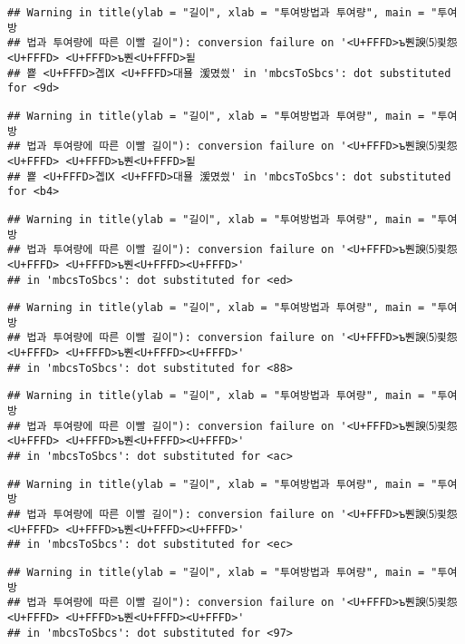 \documentclass[]{article}
\begin{document}
\begin{verbatim}
## Warning in title(ylab = "길이", xlab = "투여방법과 투여량", main = "투여방
## 법과 투여량에 따른 이빨 길이"): conversion failure on '<U+FFFD>ъ뿬諛⑸쾿怨<U+FFFD> <U+FFFD>ъ뿬<U+FFFD>됱
## 뿉 <U+FFFD>곕Ⅸ <U+FFFD>대묠 湲몄씠' in 'mbcsToSbcs': dot substituted for <9d>
\end{verbatim}

\begin{verbatim}
## Warning in title(ylab = "길이", xlab = "투여방법과 투여량", main = "투여방
## 법과 투여량에 따른 이빨 길이"): conversion failure on '<U+FFFD>ъ뿬諛⑸쾿怨<U+FFFD> <U+FFFD>ъ뿬<U+FFFD>됱
## 뿉 <U+FFFD>곕Ⅸ <U+FFFD>대묠 湲몄씠' in 'mbcsToSbcs': dot substituted for <b4>
\end{verbatim}

\begin{verbatim}
## Warning in title(ylab = "길이", xlab = "투여방법과 투여량", main = "투여방
## 법과 투여량에 따른 이빨 길이"): conversion failure on '<U+FFFD>ъ뿬諛⑸쾿怨<U+FFFD> <U+FFFD>ъ뿬<U+FFFD><U+FFFD>'
## in 'mbcsToSbcs': dot substituted for <ed>
\end{verbatim}

\begin{verbatim}
## Warning in title(ylab = "길이", xlab = "투여방법과 투여량", main = "투여방
## 법과 투여량에 따른 이빨 길이"): conversion failure on '<U+FFFD>ъ뿬諛⑸쾿怨<U+FFFD> <U+FFFD>ъ뿬<U+FFFD><U+FFFD>'
## in 'mbcsToSbcs': dot substituted for <88>
\end{verbatim}

\begin{verbatim}
## Warning in title(ylab = "길이", xlab = "투여방법과 투여량", main = "투여방
## 법과 투여량에 따른 이빨 길이"): conversion failure on '<U+FFFD>ъ뿬諛⑸쾿怨<U+FFFD> <U+FFFD>ъ뿬<U+FFFD><U+FFFD>'
## in 'mbcsToSbcs': dot substituted for <ac>
\end{verbatim}

\begin{verbatim}
## Warning in title(ylab = "길이", xlab = "투여방법과 투여량", main = "투여방
## 법과 투여량에 따른 이빨 길이"): conversion failure on '<U+FFFD>ъ뿬諛⑸쾿怨<U+FFFD> <U+FFFD>ъ뿬<U+FFFD><U+FFFD>'
## in 'mbcsToSbcs': dot substituted for <ec>
\end{verbatim}

\begin{verbatim}
## Warning in title(ylab = "길이", xlab = "투여방법과 투여량", main = "투여방
## 법과 투여량에 따른 이빨 길이"): conversion failure on '<U+FFFD>ъ뿬諛⑸쾿怨<U+FFFD> <U+FFFD>ъ뿬<U+FFFD><U+FFFD>'
## in 'mbcsToSbcs': dot substituted for <97>
\end{verbatim}
\end{document}
